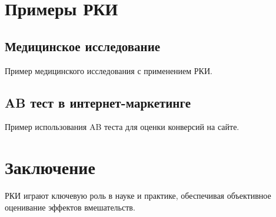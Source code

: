 \documentclass{article}
\begin{document}
\section{Примеры РКИ}

\subsection{Медицинское исследование}

Пример медицинского исследования с применением РКИ.

\subsection{AB тест в интернет-маркетинге}

Пример использования AB теста для оценки конверсий на сайте.

\section{Заключение}

РКИ играют ключевую роль в науке и практике, обеспечивая объективное оценивание эффектов вмешательств.
\end{document}

